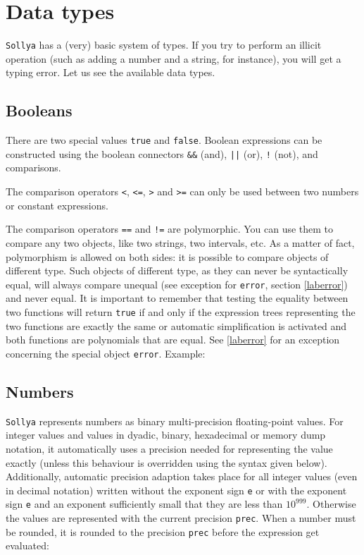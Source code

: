 \documentclass[a4paper]{article}
\newcommand{\com}[1]{\texttt{#1}}
\newcommand{\key}[1]{\texttt{#1}}
\newcommand{\sollya}{\texttt{Sollya}\xspace}
\begin{document}
\section{Data types}\label{sec:data_types}
\sollya has a (very) basic system of types. If you try to perform an illicit operation (such as adding a number and a string, for instance), you will get a typing error. Let us see the available data types.

\subsection{Booleans}
There are two special values \key{true} and \key{false}. Boolean expressions can be constructed using the boolean connectors \key{\&\&} (and), \key{||} (or), \key{!} (not), and comparisons.

The comparison operators \key{<}, \key{<=}, \key{>} and \key{>=} can only be used between two numbers or constant expressions.

The comparison operators \key{==} and \key{!=} are polymorphic. You can use them to compare any two objects, like two strings, two intervals, etc. As a matter of fact, polymorphism is allowed on both sides: it is possible to compare objects of different type. Such objects of different type, as they can never be syntactically equal, will always compare unequal (see exception for \key{error}, section \ref{laberror}) and never equal. It is important to remember that testing the equality between two functions will return \key{true} if and only if the expression trees representing the two functions are exactly the same or automatic simplification is activated and both functions are polynomials that are equal. See \ref{laberror} for an exception concerning the special object \key{error}. Example:



\subsection{Numbers} \label{sec:numbers}
\sollya represents numbers as binary multi-precision floating-point values. For integer values and values in dyadic, binary, hexadecimal or memory dump notation, it 
automatically uses a precision needed for representing the value exactly (unless this behaviour is overridden using the syntax given below). Additionally, automatic precision adaption takes place for all 
integer values (even in decimal notation) written without the exponent sign \texttt{e} or with the exponent sign \texttt{e} and an exponent sufficiently 
small that they are less than $10^{999}$. Otherwise the values are represented with the current precision \com{prec}. When a number must be rounded, it is rounded to the precision \com{prec} before the expression get evaluated:
\end{document}
